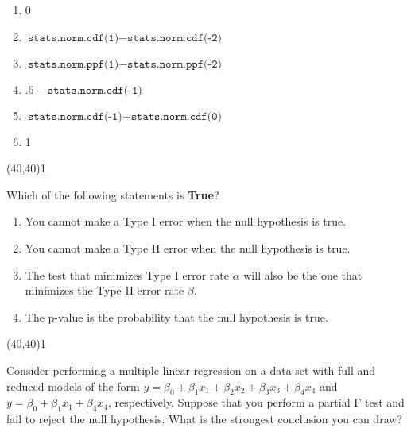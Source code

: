 \documentclass[addpoints]{exam}
\def\solutions{0}
\begin{document}
{\begin{questions}
\begin{minipage}[b]{.85\textwidth}
	\begin{enumerate}[label=\Alph*.]
		\item 0
		\item $\texttt{stats.norm.cdf(1)}-\texttt{stats.norm.cdf(-2)}$
		\item $\texttt{stats.norm.ppf(1)}-\texttt{stats.norm.ppf(-2)}$
		\item $.5-\texttt{stats.norm.cdf(-1)}$
		\item $\texttt{stats.norm.cdf(-1)}-\texttt{stats.norm.cdf(0)}$
		\item 1
	\end{enumerate}
\end{minipage}
\begin{minipage}[b]{.1\textwidth}
	\vspace{\fill}\framebox(40,40){\if\solutions1 \fi}
\end{minipage}
\clearpage

\question[3]  Which of the following statements is \textbf{True}?

\vspace{2mm}
\begin{minipage}[b]{.85\textwidth}
	\begin{enumerate}[label=\Alph*.]
		\item You cannot make a Type I error when the null hypothesis is true.
		\item You cannot make a Type II error when the null hypothesis is true.
		\item The test that minimizes Type I error rate $\alpha$ will also be the one that minimizes the Type II error rate $\beta$.
		\item The p-value is the probability that the null hypothesis is true.
	\end{enumerate}
\end{minipage}
\begin{minipage}[b]{.1\textwidth}
	\vspace{\fill}\framebox(40,40){\if\solutions1 \fi}
\end{minipage}


\question[3]  Consider performing a multiple linear regression on a data-set with full and reduced models of the form $y= \beta_0 + \beta_1 x_1+\beta_2 x_2+\beta_3 x_3+\beta_4 x_4$ and  $y= \beta_0 + \beta_1 x_1+\beta_4 x_4$, respectively.  Suppose that you perform a partial F test and fail to reject the null hypothesis. What is the strongest conclusion you can draw?


\end{questions}}
\end{document}
